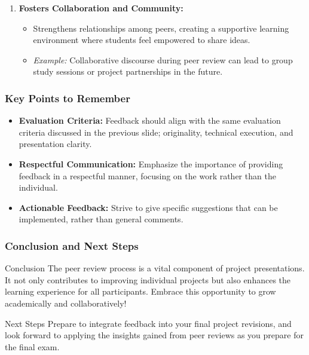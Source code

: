 \documentclass[aspectratio=169]{beamer}
\begin{document}
\begin{frame}[fragile]
\begin{enumerate}
        \item \textbf{Fosters Collaboration and Community:}
        \begin{itemize}
            \item Strengthens relationships among peers, creating a supportive learning environment where students feel empowered to share ideas.
            \item \textit{Example:} Collaborative discourse during peer review can lead to group study sessions or project partnerships in the future.
        \end{itemize}
    \end{enumerate}
\end{frame}

\begin{frame}[fragile]
    \frametitle{Key Points to Remember}
    \begin{itemize}
        \item \textbf{Evaluation Criteria:} Feedback should align with the same evaluation criteria discussed in the previous slide; originality, technical execution, and presentation clarity.
        \item \textbf{Respectful Communication:} Emphasize the importance of providing feedback in a respectful manner, focusing on the work rather than the individual.
        \item \textbf{Actionable Feedback:} Strive to give specific suggestions that can be implemented, rather than general comments.
    \end{itemize}
\end{frame}

\begin{frame}[fragile]
    \frametitle{Conclusion and Next Steps}
    \begin{block}{Conclusion}
        The peer review process is a vital component of project presentations. It not only contributes to improving individual projects but also enhances the learning experience for all participants. Embrace this opportunity to grow academically and collaboratively!
    \end{block}
    
    \begin{block}{Next Steps}
        Prepare to integrate feedback into your final project revisions, and look forward to applying the insights gained from peer reviews as you prepare for the final exam.
    \end{block}
\end{frame}
\end{document}
